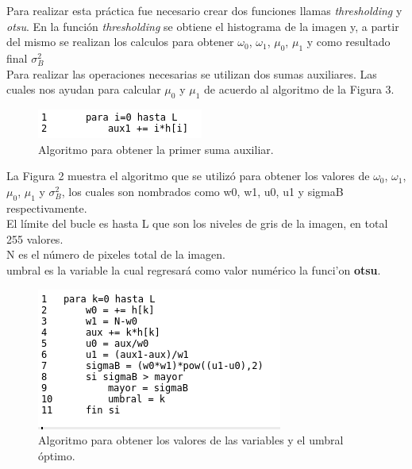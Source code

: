 \documentclass[conference]{IEEEtran}
\begin{document}
Para realizar esta pr\'actica fue necesario crear dos funciones llamas \emph{thresholding} y \emph{otsu}. En la funci\'on \emph{thresholding} se obtiene el histograma de la imagen y, a partir del mismo se realizan los calculos para obtener $\omega_0$, $\omega_1$, $\mu_0$, $\mu_1$ y como resultado final $\sigma_{B}^{2}$ \\
Para realizar las operaciones necesarias se utilizan dos sumas auxiliares. Las cuales nos ayudan para calcular $\mu_0$ y $\mu_1$ de acuerdo al algoritmo de la Figura 3.

\begin{figure}[h]
	\begin{center}
		\setlength{\unitlength}{0.00105in}
		\includegraphics[scale=0.70]{./images/ag1.png}
	\end{center}
	\caption{Algoritmo para obtener la primer suma auxiliar.}
\end{figure}

La Figura 2 muestra el algoritmo que se utiliz\'o para obtener los valores de $\omega_0$, $\omega_1$, $\mu_0$, $\mu_1$ y $\sigma_{B}^{2}$, los cuales son nombrados como w0, w1, u0, u1 y sigmaB respectivamente.\\
El l\'imite del bucle es hasta L que son los niveles de gris de la imagen, en total 255 valores.\\
N es el n\'umero de pixeles total de la imagen.\\
umbral es la variable la cual regresar\'a como valor num\'erico la funci'on \textbf{otsu}.
\begin{figure}[h]
	\begin{center}
		\setlength{\unitlength}{0.00105in}
		\includegraphics[scale=0.70]{./images/ag2.png}
	\end{center}
	\caption{Algoritmo para obtener los valores de las variables y el umbral \'optimo.}
\end{figure}
\end{document}
